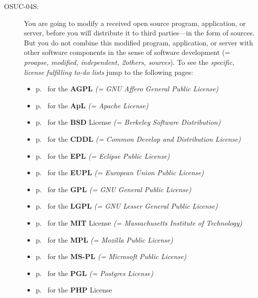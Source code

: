 \begin{description}
\item[OSUC-04S:]\label{OSUC-04S-DEF} You are going to modify a received open
source program, application, or server, before you will distribute it to third
parties---in the form of sources. But you do not combine this modified program,
application, or server with other software components in the sense of software
development (= \textit{proapse, modified, independent, 2others, sources}).
To see the \textit{specific, license fulfilling to-do lists} jump to the
following pages:
  \begin{itemize}
    \item p.\ \pageref{OSUC-04S-AGPL} for the \textbf{AGPL}
      \textit{(= GNU Affero General Public License)} 
    \item p.\ \pageref{OSUC-04S-Apache20} for the \textbf{ApL}
      \textit{(= Apache License)}
    \item p.\ \pageref{OSUC-04S-BSD} for the \textbf{BSD} License
      \textit{(= Berkeley Software Distribution)}
    \item p.\ \pageref{OSUC-04S-CDDL} for the \textbf{CDDL}
      \textit{(= Common Develop and Distribution License)}  
    \item p.\ \pageref{OSUC-04S-EPL} for the \textbf{EPL}
      \textit{(= Eclipse Public License)}     
    \item p.\ \pageref{OSUC-04S-EUPL} for the \textbf{EUPL}
      \textit{(= European Union Public License)} 
    \item p.\ \pageref{OSUC-04S-GPL} for the \textbf{GPL}
       \textit{(= GNU General Public License)} 
    \item p.\ \pageref{OSUC-04S-LGPL} for the \textbf{LGPL}
      \textit{(= GNU Lesser General Public License)}           
    \item p.\ \pageref{OSUC-04S-MIT} for the \textbf{MIT} License
       \textit{(= Massachusetts Institute of Technology)} 
    \item p.\ \pageref{OSUC-04S-MPL} for the \textbf{MPL}
      \textit{(= Mozilla Public License)}     
    \item p.\ \pageref{OSUC-04S-MS-PL} for the \textbf{MS-PL}
      \textit{(= Microsoft Public License)} 
    \item p.\ \pageref{OSUC-04S-PGL} for the \textbf{PGL}
      \textit{(= Postgres License)} 
    \item p.\ \pageref{OSUC-04S-PHP} for the \textbf{PHP} License 
  \end{itemize}
  

\end{description}
